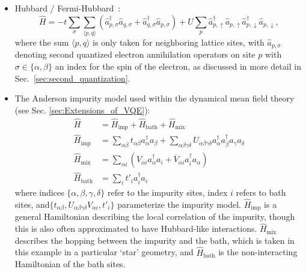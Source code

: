 \begin{itemize}
    \item Hubbard / Fermi-Hubbard~\cite{Simon2013}:
    \begin{equation}
    \label{eq:Hubbardmodel_maintext}
    \hat{H} = -t \sum_{\sigma} \sum_{\langle p, q \rangle} ( \hat{a}_{p,\sigma}^{\dagger} \hat{a}_{q,\sigma} + \hat{a}_{q,\sigma}^{\dagger} \hat{a}_{p,\sigma}) + U \sum_{p} \hat{a}_{p,\uparrow}^{\dagger}
    \hat{a}_{p,\uparrow} \hat{a}_{p,\downarrow}^{\dagger} \hat{a}_{p,\downarrow},
    \end{equation}
    where the sum $\langle p, q \rangle$ is only taken for neighboring lattice sites, with $\hat{a}_{p,\sigma}$ denoting second quantized electron annihilation operators on site $p$ with $\sigma \in \{\alpha, \beta\}$ an index for the spin of the electron, as discussed in more detail in Sec.~\ref{sec:second_quantization}.
    
    \item The Anderson impurity model used within the dynamical mean field theory~\cite{Bauer2016} (see Sec. \ref{sec:Extensions_of_VQE}):
    \begin{equation}
    \begin{aligned}
    \hat{H} & =\hat{H}_{\mathrm{imp}} +\hat{H}_{\mathrm{bath}} +\hat{H}_{\mathrm{mix}}\\
    \hat{H}_{\mathrm{imp}} & =\sum _{\alpha \beta } t_{\alpha \beta } a_{\alpha }^{\dagger } a_{\beta } +\sum _{\alpha \beta \gamma \delta } U_{\alpha \beta \gamma \delta } a_{\alpha }^{\dagger } a_{\beta }^{\dagger } a_{\gamma } a_{\delta }\\
    \hat{H}_{\mathrm{mix}} & =\sum _{\alpha i}\left( V_{\alpha i} a_{\alpha }^{\dagger } a_{i} +\overline{V}_{\alpha i} a_{i}^{\dagger } a_{\alpha }\right)\\
    \hat{H}_{\mathrm{bath}} & =\sum _{i} t'_{i} a_{i}^{\dagger } a_{i}
    \end{aligned}
    \end{equation}
    where indices $\{\alpha ,\beta ,\gamma ,\delta \}$ refer to the impurity sites, index $i$ refers to bath sites, and$\{t_{\alpha \beta } ,U_{\alpha \beta \gamma \delta } V_{\alpha i} ,t'_{i}\}$ parameterize the impurity model. $\hat{H}_{\mathrm{imp}}$ is a general Hamiltonian describing the local correlation of the impurity, though this is also often approximated to have Hubbard-like interactions. $\displaystyle \hat{H}_{\mathrm{mix}}$ describes the hopping between the impurity and the bath, which is taken in this example in a particular `star' geometry, and $\hat{H}_{\mathrm{bath}}$ is the non-interacting Hamiltonian of the bath sites. 
    

\end{itemize}
